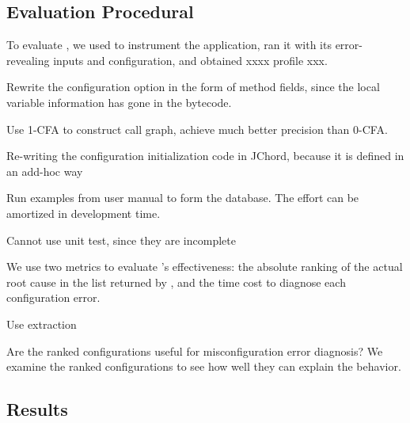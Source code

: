 \subsection{Evaluation Procedural}


To evaluate \ourtool, we used \ourtool to instrument
the application, ran it with its error-revealing
inputs and configuration, and obtained xxxx profile xxx. 

Rewrite the configuration option in the form of method fields, since
the local variable information has gone in the bytecode.

Use 1-CFA to construct call graph, achieve much better precision
than 0-CFA. 

Re-writing the configuration initialization code in JChord, because
it is defined in an add-hoc way

Run examples from user manual to form the database. The effort
can be amortized in development time.

Cannot use unit test, since they are incomplete

We use two metrics to evaluate \ourtool's effectiveness: the absolute ranking of the
actual root cause in the list returned by \ourtool, and the
time cost to diagnose each configuration error.

Use extraction~\cite{Rabkin:2011:SEP}

Are the ranked configurations useful for misconfiguration
error diagnosis?  We examine the ranked configurations to see how well they can explain the behavior.


\subsection{Results}

